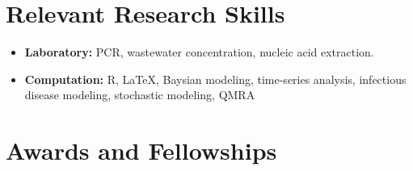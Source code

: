\documentclass[11pt,a4paper]{article}
\begin{document}
\vspace{10pt}

\section{Relevant Research Skills}
\begin{itemize}
    \item \textbf{Laboratory:} PCR, wastewater concentration, nucleic acid extraction.
    \item \textbf{Computation:} R, LaTeX, Baysian modeling, time-series analysis, infectious disease modeling, stochastic modeling, QMRA
\end{itemize}


\section{Awards and Fellowships}
\end{document}
